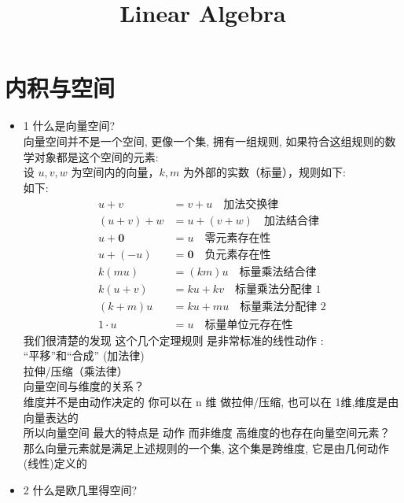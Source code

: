 \documentclass[12pt]{article}
\title{Linear Algebra}
\date{}
\begin{document}
\maketitle

\section{内积与空间}
\begin{flushleft}
    \begin{itemize}
        \item 1 什么是向量空间? \\

              向量空间并不是一个空间, 更像一个集, 拥有一组规则, 如果符合这组规则的数学对象都是这个空间的元素:  \\
              设 $u, v, w$ 为空间内的向量，$k, m$ 为外部的实数（标量），规则如下: \\
              如下: \\
              \begin{align}
                  u + v          & = v + u \quad \text{加法交换律}       \\
                  (u + v) + w    & = u + (v + w) \quad \text{加法结合律} \\
                  u + \mathbf{0} & = u \quad \text{零元素存在性}          \\
                  u + (-u)       & = \mathbf{0} \quad \text{负元素存在性} \\
                  k(mu)          & = (km)u \quad \text{标量乘法结合律}     \\
                  k(u + v)       & = ku + kv \quad \text{标量乘法分配律 1} \\
                  (k + m)u       & = ku + mu \quad \text{标量乘法分配律 2} \\
                  1 \cdot u      & = u \quad \text{标量单位元存在性}
              \end{align}
              我们很清楚的发现 这个几个定理规则 是非常标准的线性动作 :  \\
              “平移”和“合成” (加法律)  \\
              拉伸/压缩（乘法律） \\

              向量空间与维度的关系？\\
              维度并不是由动作决定的 你可以在 n 维 做拉伸/压缩, 也可以在 1维,维度是由向量表达的 \\
              所以向量空间 最大的特点是 动作 而非维度 高维度的也存在向量空间元素？ \\
              那么向量元素就是满足上述规则的一个集, 这个集是跨维度, 它是由几何动作(线性)定义的 \\
              \vspace{0.5em}
        \item 2 什么是欧几里得空间? \\


\end{itemize}
\end{flushleft}
\end{document}
